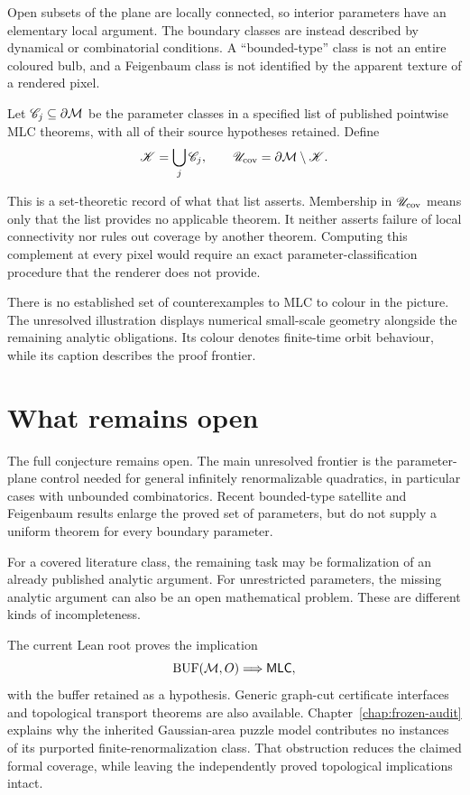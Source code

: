 Open subsets of the plane are locally connected, so interior parameters
have an elementary local argument.  The boundary classes are instead
described by dynamical or combinatorial conditions.  A ``bounded-type''
class is not an entire coloured bulb, and a Feigenbaum class is not
identified by the apparent texture of a rendered pixel.

\begin{definition}
Let $\mathscr C_j\subseteq\partial\mathcal M$ be the parameter classes in a
specified list of published pointwise MLC theorems, with all of their
source hypotheses retained.  Define
\[
 \mathscr K=\bigcup_j\mathscr C_j,\qquad
 \mathscr U_{\rm cov}=\partial\mathcal M\setminus\mathscr K.
\]
\end{definition}

This is a set-theoretic record of what that list asserts.  Membership in
$\mathscr U_{\rm cov}$ means only that the list provides no applicable
theorem.  It neither asserts failure of local connectivity nor rules out
coverage by another theorem.  Computing this complement at every pixel
would require an exact parameter-classification procedure that the
renderer does not provide.

\begin{conditionalstep}
There is no established set of counterexamples to MLC to colour in the
picture.  The unresolved illustration displays numerical small-scale
geometry alongside the remaining analytic obligations.  Its colour
denotes finite-time orbit behaviour, while its caption describes the
proof frontier.
\end{conditionalstep}

\section{What remains open}

The full conjecture remains open.  The main unresolved frontier is the
parameter-plane control needed for general infinitely renormalizable
quadratics, in particular cases with unbounded combinatorics.  Recent
bounded-type satellite and Feigenbaum results enlarge the proved set of
parameters, but do not supply a uniform theorem for every boundary
parameter.

For a covered literature class, the remaining task may be formalization
of an already published analytic argument.  For unrestricted parameters,
the missing analytic argument can also be an open mathematical problem.
These are different kinds of incompleteness.

The current Lean root proves the implication
\[
 \mathrm{BUF}(\mathcal M,O)\Longrightarrow\mathsf{MLC},
\]
with the buffer retained as a hypothesis.  Generic graph-cut certificate
interfaces and topological transport theorems are also available.
Chapter~\ref{chap:frozen-audit} explains why the inherited
Gaussian-area puzzle model contributes no instances of its purported
finite-renormalization class.  That obstruction reduces the claimed
formal coverage, while leaving the independently proved topological
implications intact.
